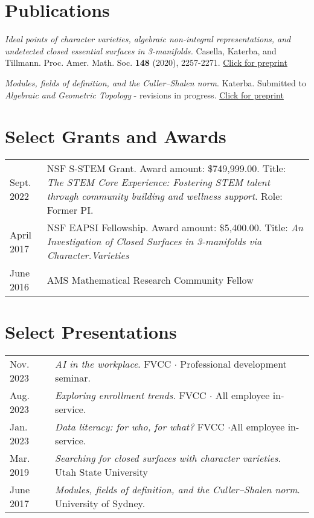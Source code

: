 \documentclass[12pt]{article}
\begin{document}
\section{Publications}

\textit{Ideal points of character varieties, algebraic non-integral representations, and undetected closed essential surfaces in 3-manifolds.} Casella, Katerba, and Tillmann. Proc. Amer. Math. Soc. \textbf{148} (2020), 2257-2271. \href{https://arxiv.org/abs/1808.02535}{Click for preprint}

\noindent \textit{Modules, fields of definition, and the Culler--Shalen norm}. Katerba. Submitted to \textit{Algebraic and Geometric Topology} - revisions in progress. \href{https://arxiv.org/abs/1805.04585}{Click for preprint}

\section{Select Grants and Awards}

\begin{tabular}{ l p{15in} }

Sept. 2022 & NSF S-STEM Grant. Award amount: \$749,999.00.
			\newline Title: \textit{The STEM Core Experience: Fostering STEM talent through community
				\newline building and wellness support}. Role: Former PI. \\
April 2017 & NSF EAPSI Fellowship. Award amount: \$5,400.00. 
			\newline Title: \textit{An Investigation of Closed Surfaces in 3-manifolds via Character.Varieties} \\
June 2016 & AMS Mathematical Research Community Fellow 

\end{tabular}

\section{Select Presentations}

\begin{tabular}{ l p{15in} }

Nov. 2023 & \textit{AI in the workplace}. FVCC $\cdot$ Professional development seminar. \\
Aug. 2023 & \textit{Exploring enrollment trends.} FVCC $\cdot$ All employee in-service. \\
Jan. 2023 &  \textit{Data literacy: for who, for what?} FVCC  $\cdot$All employee in-service. \\
Mar. 2019 & \textit{Searching for closed surfaces with character varieties}. Utah State University \\
June 2017 & \textit{Modules, fields of definition, and the Culler--Shalen norm}. University of Sydney.

\end{tabular}
\end{document}
